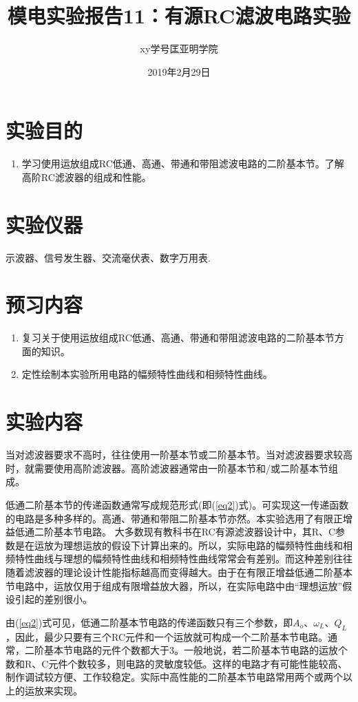 \documentclass[a4paper]{article}
\title{模电实验报告11：有源RC滤波电路实验}
\author{xy\quad 学号\quad 匡亚明学院}
\date{2019年2月29日}
\begin{document}
\maketitle


\section{实验目的}
\begin{enumerate}
\item 学习使用运放组成RC低通、高通、带通和带阻滤波电路的二阶基本节。了解高阶RC滤波器的组成和性能。
\end{enumerate}

\section{实验仪器}
示波器、信号发生器、交流毫伏表、数字万用表.

\section{预习内容}
\begin{enumerate}
\item 复习关于使用运放组成RC低通、高通、带通和带阻滤波电路的二阶基本节方面的知识。
\item 定性绘制本实验所用电路的幅频特性曲线和相频特性曲线。
\end{enumerate}

\section{实验内容}
当对滤波器要求不高时，往往使用一阶基本节或二阶基本节。当对滤波器要求较高时，就需要使用高阶滤波器。高阶滤波器通常由一阶基本节和/或二阶基本节组成。

低通二阶基本节的传递函数通常写成规范形式(即(\ref{eq2})式)。可实现这一传递函数的电路是多种多样的。高通、带通和带阻二阶基本节亦然。本实验选用了有限正增益低通二阶基本节电路。
大多数现有教科书在RC有源滤波器设计中，其R、C参数是在运放为理想运放的假设下计算出来的。所以，实际电路的幅频特性曲线和相频特性曲线与理想的幅频特性曲线和相频特性曲线常常会有差别。而这种差别往往随着滤波器的理论设计性能指标越高而变得越大。由于在有限正增益低通二阶基本节电路中，运放仅用于组成有限增益放大器，所以，在实际电路中由“理想运放”假设引起的差别很小。

由(\ref{eq2})式可见，低通二阶基本节电路的传递函数只有三个参数，即$A_o$、$\omega_L$、$Q_L$，因此，最少只要有三个RC元件和一个运放就可构成一个二阶基本节电路。通常，二阶基本节电路的元件个数都大于3。一般地说，若二阶基本节电路的运放个数和R、C元件个数较多，则电路的灵敏度较低。这样的电路才有可能性能较高、制作调试较方便、工作较稳定。实际中高性能的二阶基本节电路常用两个或两个以上的运放来实现。
\end{document}
